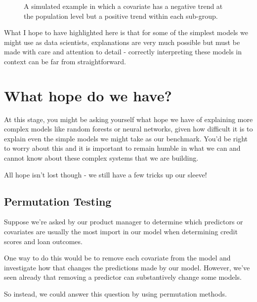 \documentclass[
  letterpaper,
  DIV=11,
  numbers=noendperiod]{scrreprt}
\begin{document}
\begin{figure}


\caption{\label{fig-simpsons-paradox}A simulated example in which a
covariate has a negative trend at the population level but a positive
trend within each sub-group.}

\end{figure}%

What I hope to have highlighted here is that for some of the simplest
models we might use as data scientists, explanations are very much
possible but must be made with care and attention to detail - correctly
interpreting these models in context can be far from straightforward.

\section{What hope do we have?}\label{what-hope-do-we-have}

At this stage, you might be asking yourself what hope we have of
explaining more complex models like random forests or neural networks,
given how difficult it is to explain even the simple models we might
take as our benchmark. You'd be right to worry about this and it is
important to remain humble in what we can and cannot know about these
complex systems that we are building.

All hope isn't lost though - we still have a few tricks up our sleeve!

\subsection{Permutation Testing}\label{permutation-testing}

Suppose we're asked by our product manager to determine which predictors
or covariates are usually the most import in our model when determining
credit scores and loan outcomes.

One way to do this would be to remove each covariate from the model and
investigate how that changes the predictions made by our model. However,
we've seen already that removing a predictor can substantively change
some models.

So instead, we could answer this question by using permutation methods.
\end{document}
